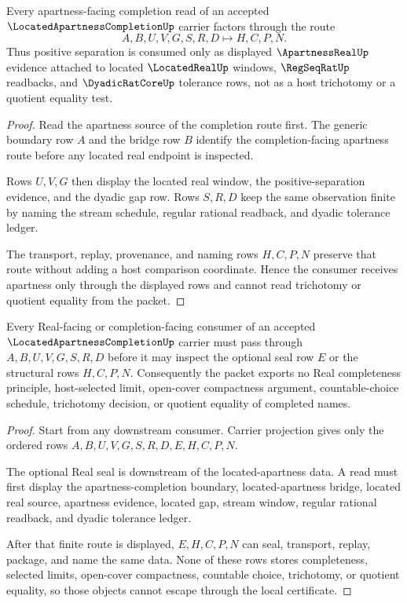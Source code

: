 \begin{theorem}
\label{thm:located-apartness-completion-apartness-route}
Every apartness-facing completion read of an accepted $\LocatedApartnessCompletionUp$ carrier factors through the route
$$
A,B,U,V,G,S,R,D \longmapsto H,C,P,N .
$$
Thus positive separation is consumed only as displayed $\ApartnessRealUp$ evidence attached to located $\LocatedRealUp$ windows, $\RegSeqRatUp$ readbacks, and $\DyadicRatCoreUp$ tolerance rows, not as a host trichotomy or a quotient equality test.
\end{theorem}
\begin{proof}
Read the apartness source of the completion route first. The generic boundary row $A$ and the bridge row $B$ identify the completion-facing apartness route before any located real endpoint is inspected.

Rows $U,V,G$ then display the located real window, the positive-separation evidence, and the dyadic gap row. Rows $S,R,D$ keep the same observation finite by naming the stream schedule, regular rational readback, and dyadic tolerance ledger.

The transport, replay, provenance, and naming rows $H,C,P,N$ preserve that route without adding a host comparison coordinate. Hence the consumer receives apartness only through the displayed rows and cannot read trichotomy or quotient equality from the packet.
\end{proof}

\begin{theorem}
\label{thm:located-apartness-completion-nonescape}
Every Real-facing or completion-facing consumer of an accepted $\LocatedApartnessCompletionUp$ carrier must pass through $A,B,U,V,G,S,R,D$ before it may inspect the optional seal row $E$ or the structural rows $H,C,P,N$. Consequently the packet exports no Real completeness principle, host-selected limit, open-cover compactness argument, countable-choice schedule, trichotomy decision, or quotient equality of completed names.
\end{theorem}
\begin{proof}
Start from any downstream consumer. Carrier projection gives only the ordered rows $A,B,U,V,G,S,R,D,E,H,C,P,N$.

The optional Real seal is downstream of the located-apartness data. A read must first display the apartness-completion boundary, located-apartness bridge, located real source, apartness evidence, located gap, stream window, regular rational readback, and dyadic tolerance ledger.

After that finite route is displayed, $E,H,C,P,N$ can seal, transport, replay, package, and name the same data. None of these rows stores completeness, selected limits, open-cover compactness, countable choice, trichotomy, or quotient equality, so those objects cannot escape through the local certificate.
\end{proof}

